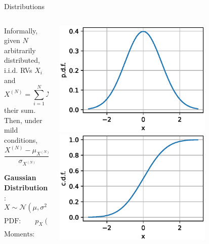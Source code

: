 {\begin{frame}{Distributions}
\begin{columns}[onlytextwidth]
\begin{column}{0.55\textwidth}
                Informally, given $N$ arbitrarily distributed, i.i.d. RVs $X_i$ and
                $$
                    X^{(N)} = \sum_{i=1}^N X_i
                $$
                their sum. Then, under mild conditions,
                $$
                    \frac{X^{(N)} - \mu_{X^{(N)}}}{\sigma_{X^{(N)}}} \quad \sim \quad \text{approximately Gaussian}
                $$

                \begin{boxed}
                    \textbf{Gaussian Distribution}:
                    $$X \sim \mathcal{N}(\mu, \sigma^2)$$
                    \vspace*{-2mm}
                    $$\text{PDF:}\qquad p_X(x) = \frac{1}{\sqrt{2\pi}\sigma}e^{-\frac{(x-\mu)^2}{2\sigma^2}}$$
                    $$\text{Moments:}\qquad \displaystyle \mu_X = \mu \quad \sigma_X^2 = \sigma^2$$
                \end{boxed}

            \end{column}
            \begin{column}{0.45\textwidth}
                \begin{center}
                    \includegraphics[width=0.73\textwidth]{fig/prob_norm_pdf.eps}
                    \qquad
                    \includegraphics[width=0.73\textwidth]{fig/prob_norm_cdf.eps}
                \end{center}


\end{column}
\end{columns}
\end{frame}}
